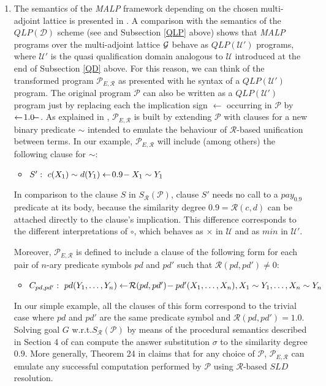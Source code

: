 \documentclass{sigplanconf}
\newcommand{\qdom}{\mathcal{D}} \newcommand{\dqdom}{D \setminus \{\bot\}} \newcommand{\bqdom}{(D \setminus \{\bot\}) \uplus \{?\}}
\newcommand{\U}{\mathcal{U}}
\newcommand{\simrel}{\mathcal{R}}
\newcommand{\qlp}[1]{QLP({#1})} \newcommand{\slp}[2]{SLP({#1,#2})} \newcommand{\sqlp}[2]{SQLP({#1,#2})} \newcommand{\bqlp}[1]{BQLP({#1})} \newcommand{\clp}[1]{CLP({#1})}
\newcommand{\trans}[2]{S_{#1}(#2)}
\newcommand{\MAProg}{\mathcal{P}_{E, \simrel}}
\newcommand{\Prog}{\mathcal{P}} \newcommand{\UProg}{\mathcal{P_U}}
\newcommand{\MALP}{{\em MALP }}
\theoremstyle{definition}
\theoremstyle{plain}
\begin{document}
\begin{enumerate}
    \item The semantics of the \MALP framework depending on the chosen multi-adjoint lattice is presented in \cite{MOV04}. A comparison
with the semantics of the $\qlp{\qdom}$ scheme (see \cite{RR08} and Subsection \ref{QLP} above) shows that \MALP programs over the multi-adjoint lattice $\mathcal{G}$ behave as $\qlp{\U'}$ programs, where $\U'$ is the quasi qualification domain analogous to $\U$ introduced at the end of Subsection \ref{QD} above. For this reason, we can think of the transformed program $\MAProg$ as presented with he syntax of a $\qlp{\U'}$ program. The original program $\Prog$ can also be  written as a $\qlp{\U'}$ program just by replacing each the implication sign $\gets$ occurring  in $\Prog$ by $\gets\!1.0\!-$. As explained in \cite{MOV04}, $\MAProg$ is built by extending $\Prog$ with clauses for  a new binary predicate $\sim$ intended to emulate the behaviour of $\simrel$-based unification between terms. In our example, $\MAProg$ will include (among others) the following clause
for $\sim$:
    \begin{itemize}
        \item $S':\,\, c(X_1) \sim d(Y_1) \gets\!0.9\!- X_1 \sim Y_1$
    \end{itemize}
In comparison to the clause $S$  in $\trans{\simrel}{\Prog}$, clause $S'$ needs no call to a $pay_{0.9}$ predicate at its body, because the similarity degree $0.9 = \simrel(c,d)$ can be attached directly to the clause's implication. This difference corresponds to the different interpretations of $\circ$, which behaves as $\times$ in $\U$ and as $min$ in $\U'$.

Moreover, $\MAProg$ is defined to include a clause of the following form for each pair of $n$-ary predicate symbols $pd$ and $pd'$ such that $\simrel(pd,pd') \neq 0$:
\begin{itemize}
    \item $C_{pd, pd'}:\,\, pd(Y_1, \ldots, Y_n)  \qgets{\simrel(pd,pd')} \\ pd'(X_1, \ldots, X_n), X_1 \sim Y_1,  \ldots, X_n \sim Y_n$
\end{itemize}
In our simple example, all the clauses of this form correspond to the trivial case where $pd$ and $pd'$ are the same predicate symbol and $\simrel(pd,pd') = 1.0$. Solving goal $G$ w.r.t.$\trans{\simrel}{\Prog}$ by means of the procedural semantics described in Section 4 of \cite{MOV04}
can compute the answer substitution $\sigma$ to the similarity degree $0.9$. More generally, Theorem 24 in \cite{MOV04} claims that for any choice of $\Prog$, $\MAProg$ can emulate any successful computation performed by $\Prog$ using $\simrel$-based $SLD$ resolution.
\end{enumerate}
\end{document}

